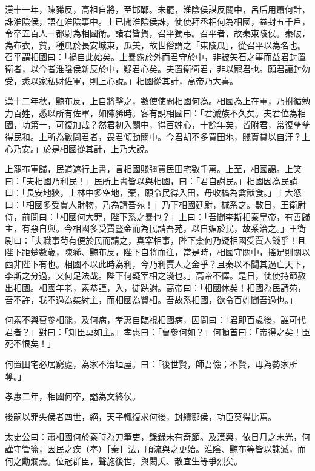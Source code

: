 \begin{pinyinscope}
漢十一年，陳豨反，高祖自將，至邯鄲。未罷，淮陰侯謀反關中，呂后用蕭何計，誅淮陰侯，語在淮陰事中。上已聞淮陰侯誅，使使拜丞相何為相國，益封五千戶，令卒五百人一都尉為相國衛。諸君皆賀，召平獨弔。召平者，故秦東陵侯。秦破，為布衣，貧，種瓜於長安城東，瓜美，故世俗謂之「東陵瓜」，從召平以為名也。召平謂相國曰：「禍自此始矣。上暴露於外而君守於中，非被矢石之事而益君封置衛者，以今者淮陰侯新反於中，疑君心矣。夫置衛衛君，非以寵君也。願君讓封勿受，悉以家私財佐軍，則上心說。」相國從其計，高帝乃大喜。

漢十二年秋，黥布反，上自將擊之，數使使問相國何為。相國為上在軍，乃拊循勉力百姓，悉以所有佐軍，如陳豨時。客有說相國曰：「君滅族不久矣。夫君位為相國，功第一，可復加哉？然君初入關中，得百姓心，十餘年矣，皆附君，常復孳孳得民和。上所為數問君者，畏君傾動關中。今君胡不多買田地，賤貰貸以自汙？上心乃安。」於是相國從其計，上乃大說。

上罷布軍歸，民道遮行上書，言相國賤彊買民田宅數千萬。上至，相國謁。上笑曰：「夫相國乃利民！」民所上書皆以與相國，曰：「君自謝民。」相國因為民請曰：「長安地狹，上林中多空地，棄，願令民得入田，毋收槁為禽獸食。」上大怒曰：「相國多受賈人財物，乃為請吾苑！」乃下相國廷尉，械系之。數日，王衛尉侍，前問曰：「相國何大罪，陛下系之暴也？」上曰：「吾聞李斯相秦皇帝，有善歸主，有惡自與。今相國多受賈豎金而為民請吾苑，以自媚於民，故系治之。」王衛尉曰：「夫職事茍有便於民而請之，真宰相事，陛下柰何乃疑相國受賈人錢乎！且陛下距楚數歲，陳豨、黥布反，陛下自將而往，當是時，相國守關中，搖足則關以西非陛下有也。相國不以此時為利，今乃利賈人之金乎？且秦以不聞其過亡天下，李斯之分過，又何足法哉。陛下何疑宰相之淺也。」高帝不懌。是日，使使持節赦出相國。相國年老，素恭謹，入，徒跣謝。高帝曰：「相國休矣！相國為民請苑，吾不許，我不過為桀紂主，而相國為賢相。吾故系相國，欲令百姓聞吾過也。」

何素不與曹參相能，及何病，孝惠自臨視相國病，因問曰：「君即百歲後，誰可代君者？」對曰：「知臣莫如主。」孝惠曰：「曹參何如？」何頓首曰：「帝得之矣！臣死不恨矣！」

何置田宅必居窮處，為家不治垣屋。曰：「後世賢，師吾儉；不賢，毋為勢家所奪。」

孝惠二年，相國何卒，謚為文終侯。

後嗣以罪失侯者四世，絕，天子輒復求何後，封續酂侯，功臣莫得比焉。

太史公曰：蕭相國何於秦時為刀筆吏，錄錄未有奇節。及漢興，依日月之末光，何謹守管籥，因民之疾（奉）［秦］法，順流與之更始。淮陰、黥布等皆以誅滅，而何之勳爛焉。位冠群臣，聲施後世，與閎夭、散宜生等爭烈矣。


\end{pinyinscope}